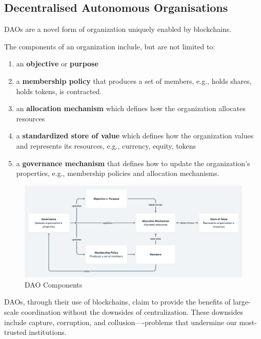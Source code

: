 \documentclass[
]{article}
\providecommand{\tightlist}{%
  \setlength{\itemsep}{0pt}\setlength{\parskip}{0pt}}
\begin{document}
\hypertarget{decentralised-autonomous-organisations}{%
\subsection{Decentralised Autonomous
Organisations}\label{decentralised-autonomous-organisations}}

DAOs are a novel form of organization uniquely enabled by blockchains.

The components of an organization include, but are not limited to:

\begin{enumerate}
\def\labelenumi{\arabic{enumi}.}
\tightlist
\item
  an \textbf{objective} or \textbf{purpose}
\item
  a \textbf{membership policy} that produces a set of members, e.g.,
  holds shares, holds tokens, is contracted.
\item
  an \textbf{allocation mechanism} which defines how the organization
  allocates resources
\item
  a \textbf{standardized store of value} which defines how the
  organization values and represents its resources, e.g., currency,
  equity, tokens
\item
  a \textbf{governance mechanism} that defines how to update the
  organization's properties, e.g., membership policies and allocation
  mechanisms.
\end{enumerate}

\begin{figure}
\centering
\includegraphics[width=\textwidth]{./img/components.png}
\caption{DAO Components}
\end{figure}

DAOs, through their use of blockchains, claim to provide the benefits of
large-scale coordination without the downsides of centralization. These
downsides include capture, corruption, and collusion----problems that
undermine our most-trusted institutions.
\end{document}

